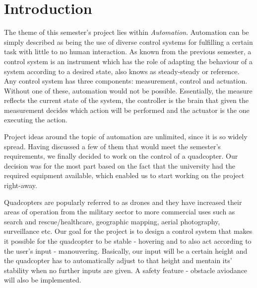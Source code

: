 \section{Introduction}

The theme of this semester's project lies within \textit{Automation}. Automation can be simply described as being the use of diverse control systems for fulfilling a certain task with little to no human interaction. As known from the previous semester, a control system is an instrument which has the role of adapting the behaviour of a system according to a desired state, also knows as steady-steady or reference. Any control system has three components: measurement, control and actuation. Without one of these, automation would not be possible. Essentially, the measure reflects the current state of the system, the controller is the brain that given the measurement decides which action will be performed and the actuator is the one executing the action. 

Project ideas around the topic of automation are unlimited, since it is so widely spread. Having discussed a few of them that would meet the semester's requirements, we finally decided to work on the control of a quadcopter. Our decision was for the most part based on the fact that the university had the required equipment available, which enabled us to start working on the project right-away. 

Quadcopters are popularly referred to as drones and they have increased their areas of operation from the military sector to more commercial uses such as search and rescue/healthcare, geographic mapping, aerial photography, surveillance etc. Our goal for the project is to design a control system that makes it possible for the quadcopter to be stable - hovering and to also act according to the user's input - manouvering. Basically, our input will be a certain height and the quadcopter has to automatically adjust to that height and mentain its' stability when no further inputs are given. A safety feature - obstacle aviodance will also be implemented. 
